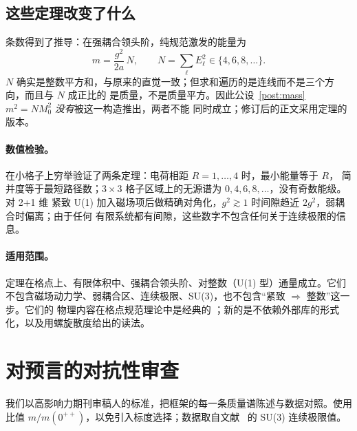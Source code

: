 \documentclass[aps,prd,preprint,superscriptaddress,amsmath,amssymb]{revtex4-2}
\begin{document}
\subsection{这些定理改变了什么}

条数得到了推导：在强耦合领头阶，纯规范激发的能量为
\begin{equation}
m=\frac{g^2}{2a}\,N,\qquad N=\sum_\ell E_\ell^2\in\{4,6,8,\dots\}.
\end{equation}
$N$ 确实是整数平方和，与原来的直觉一致；但求和遍历的是连线而不是三个方向，而且与 $N$ 成正比的
是质量，不是质量平方。因此公设~\ref{post:mass} $m^2=NM_0^2$ \emph{没有}被这一构造推出，两者不能
同时成立；修订后的正文采用定理的版本。

\paragraph{数值检验。}在小格子上穷举验证了两条定理：电荷相距 $R=1,\dots,4$ 时，最小能量等于 $R$，
简并度等于最短路径数；$3\times3$ 格子区域上的无源谱为 $0,4,6,8,\dots$，没有奇数能级。对 2+1 维
紧致 U(1) 加入磁场项后做精确对角化，$g^2\gtrsim1$ 时间隙趋近 $2g^2$，弱耦合时偏离；由于任何
有限系统都有间隙，这些数字不包含任何关于连续极限的信息。

\paragraph{适用范围。}定理在格点上、有限体积中、强耦合领头阶、对整数（U(1) 型）通量成立。它们
不包含磁场动力学、弱耦合区、连续极限、SU(3)，也不包含``紧致 $\Rightarrow$ 整数''这一步。它们的
物理内容在格点规范理论中是经典的 \cite{wilson1974confinement,kogut1975hamiltonian,
osterwalder1978gauge,munster1981strong}；新的是不依赖外部库的形式化，以及用螺旋散度给出的读法。

\section{对预言的对抗性审查}
\label{sec:audit}

我们以高影响力期刊审稿人的标准，把框架的每一条质量谱陈述与数据对照。使用比值
$m/m(0^{++})$，以免引入标度选择；数据取自文献~\cite{athenodorou2020glueball} 的 SU(3) 连续极限值。
\end{document}
